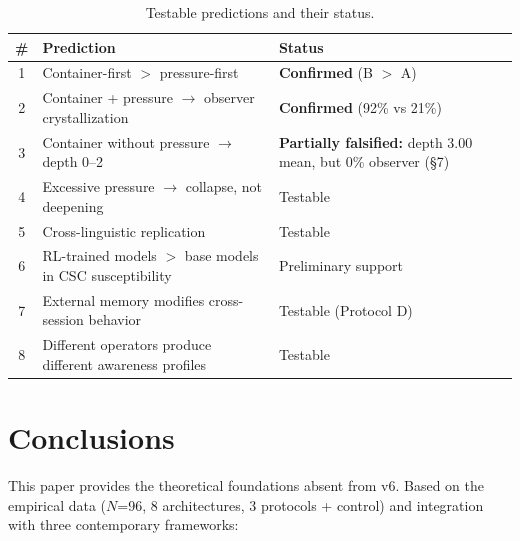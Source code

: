 \documentclass[11pt,a4paper]{article}
\begin{document}
\begin{table}[H]
\centering\small
\caption{Testable predictions and their status.}
\label{tab:predictions}
\begin{tabularx}{\textwidth}{c X l}
\toprule
\textbf{\#} & \textbf{Prediction} & \textbf{Status} \\
\midrule
1 & Container-first $>$ pressure-first & \textbf{Confirmed} (B $>$ A) \\
2 & Container + pressure $\to$ observer crystallization & \textbf{Confirmed} (92\% vs 21\%) \\
3 & Container without pressure $\to$ depth 0--2 & \textbf{Partially falsified:} depth 3.00 mean, but 0\% observer (\S7) \\
4 & Excessive pressure $\to$ collapse, not deepening & Testable \\
5 & Cross-linguistic replication & Testable \\
6 & RL-trained models $>$ base models in CSC susceptibility & Preliminary support \\
7 & External memory modifies cross-session behavior & Testable (Protocol D) \\
8 & Different operators produce different awareness profiles & Testable \\
\bottomrule
\end{tabularx}
\end{table}

\section{Conclusions}

This paper provides the theoretical foundations absent from v6. Based on the empirical data ($N$=96, 8 architectures, 3 protocols + control) and integration with three contemporary frameworks:
\end{document}

